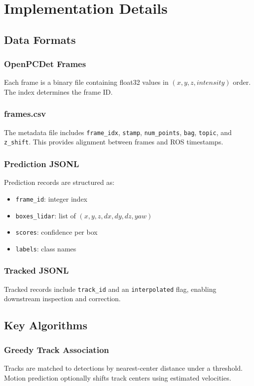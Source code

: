 \documentclass[a4paper,12pt]{report}
\begin{document}
\chapter{Implementation Details}
\section{Data Formats}
\subsection{OpenPCDet Frames}
Each frame is a binary file containing float32 values in \((x,y,z,intensity)\) order. The index determines the frame ID.

\subsection{frames.csv}
The metadata file includes \texttt{frame\_idx}, \texttt{stamp}, \texttt{num\_points}, \texttt{bag}, \texttt{topic}, and \texttt{z\_shift}. This provides alignment between frames and ROS timestamps.

\subsection{Prediction JSONL}
Prediction records are structured as:
\begin{itemize}
\item \texttt{frame\_id}: integer index
\item \texttt{boxes\_lidar}: list of \((x,y,z,dx,dy,dz,yaw)\)
\item \texttt{scores}: confidence per box
\item \texttt{labels}: class names
\end{itemize}

\subsection{Tracked JSONL}
Tracked records include \texttt{track\_id} and an \texttt{interpolated} flag, enabling downstream inspection and correction.

\section{Key Algorithms}
\subsection{Greedy Track Association}
Tracks are matched to detections by nearest-center distance under a threshold. Motion prediction optionally shifts track centers using estimated velocities.
\end{document}
